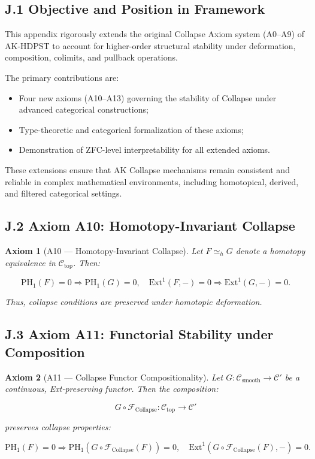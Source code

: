 \documentclass[11pt]{article}
\newtheorem{axiom}{Axiom}[section]
\begin{document}
\subsection*{J.1 Objective and Position in Framework}

This appendix rigorously extends the original Collapse Axiom system (A0–A9) of AK-HDPST to account for higher-order structural stability under deformation, composition, colimits, and pullback operations.

The primary contributions are:

\begin{itemize}
    \item Four new axioms (A10–A13) governing the stability of Collapse under advanced categorical constructions;
    \item Type-theoretic and categorical formalization of these axioms;
    \item Demonstration of ZFC-level interpretability for all extended axioms.
\end{itemize}

These extensions ensure that AK Collapse mechanisms remain consistent and reliable in complex mathematical environments, including homotopical, derived, and filtered categorical settings.

\subsection*{J.2 Axiom A10: Homotopy-Invariant Collapse}

\begin{axiom}[A10 — Homotopy-Invariant Collapse]
Let \( F \simeq_h G \) denote a homotopy equivalence in \( \mathcal{C}_{\mathrm{top}} \). Then:

\[
\mathrm{PH}_1(F) = 0 \Rightarrow \mathrm{PH}_1(G) = 0,
\quad \mathrm{Ext}^1(F, -) = 0 \Rightarrow \mathrm{Ext}^1(G, -) = 0.
\]

Thus, collapse conditions are preserved under homotopic deformation.
\end{axiom}

\subsection*{J.3 Axiom A11: Functorial Stability under Composition}

\begin{axiom}[A11 — Collapse Functor Compositionality]
Let \( G : \mathcal{C}_{\mathrm{smooth}} \to \mathcal{C}' \) be a continuous, Ext-preserving functor. Then the composition:

\[
G \circ \mathcal{F}_{\mathrm{Collapse}} : \mathcal{C}_{\mathrm{top}} \to \mathcal{C}'
\]

preserves collapse properties:

\[
\mathrm{PH}_1(F) = 0 \Rightarrow \mathrm{PH}_1(G \circ \mathcal{F}_{\mathrm{Collapse}}(F)) = 0,
\quad \mathrm{Ext}^1(G \circ \mathcal{F}_{\mathrm{Collapse}}(F), -) = 0.
\]
\end{axiom}
\end{document}
